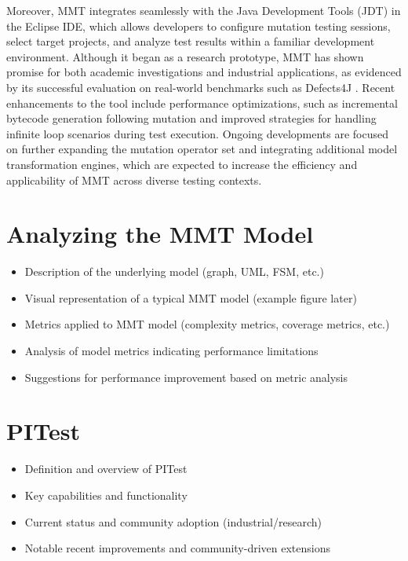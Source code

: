 \documentclass[sigplan, nonacm]{acmart}
\begin{document}
Moreover, MMT integrates seamlessly with the Java Development Tools (JDT) in the Eclipse IDE, which allows developers to configure mutation testing sessions, select target projects, and analyze test results within a familiar development environment. Although it began as a research prototype, MMT has shown promise for both academic investigations and industrial applications, as evidenced by its successful evaluation on real-world benchmarks such as Defects4J \cite{Defects4J2014}. Recent enhancements to the tool include performance optimizations, such as incremental bytecode generation following mutation and improved strategies for handling infinite loop scenarios during test execution. Ongoing developments are focused on further expanding the mutation operator set and integrating additional model transformation engines, which are expected to increase the efficiency and applicability of MMT across diverse testing contexts.

\section{Analyzing the MMT Model}
\begin{itemize}
    \item Description of the underlying model (graph, UML, FSM, etc.)
    \item Visual representation of a typical MMT model (example figure later)
    \item Metrics applied to MMT model (complexity metrics, coverage metrics, etc.)
    \item Analysis of model metrics indicating performance limitations
    \item Suggestions for performance improvement based on metric analysis
\end{itemize}

\section{PITest}
\begin{itemize}
    \item Definition and overview of PITest
    \item Key capabilities and functionality
    \item Current status and community adoption (industrial/research)
    \item Notable recent improvements and community-driven extensions
\end{itemize}
\end{document}
